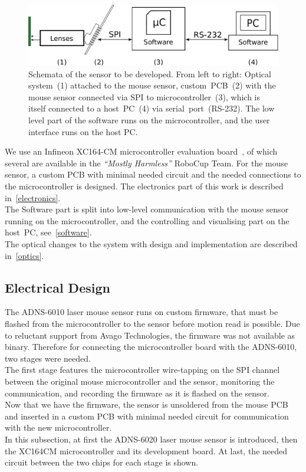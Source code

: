 \documentclass[12pt,a4paper]{article}
\newcommand{\MH}{\emph{``Mostly Harmless''} RoboCup Team\xspace}
\begin{document}
\begin{figure}[hb]
\begin{center}
\includegraphics[width=0.9\columnwidth]{figures/block_diagram}
\caption{\label{fig:block-diag-sens}
Schemata of the sensor to be developed.
From left to right:
Optical system~(1) attached to the mouse sensor,
custom~PCB~(2) with the mouse sensor connected via SPI to microcontroller~(3), which is itself connected to a host~PC~(4) via serial~port~(RS-232).
The low level part of the software runs on the microcontroller, and the user interface runs on the host PC.
}

\end{center}
\end{figure}

We use an Infineon XC164-CM microcontroller evaluation board~\cite{xc}, of which several are available in the \MH.
For the mouse sensor, a custom PCB with minimal needed circuit and the needed connections to the microcontroller is designed.
The electronics part of this work is described in~\autoref{electronics}.\\
The Software part is split into low-level communication with the mouse sensor running on the microcontroller, and the controlling and visualising part on the host~PC, see~\autoref{software}.\\
The optical changes to the system with design and implementation are described in~\autoref{optics}.


\subsection{Electrical Design}
\label{electronics}


The ADNS-6010 laser mouse sensor runs on custom firmware, that must be flashed from the microcontroller to the sensor before motion read is possible.
Due to reluctant support from Avago Technologies, the firmware was not available as binary.
Therefore for connecting the microcontroller board with the ADNS-6010, two stages were needed.\\
The first stage features the microcontroller wire-tapping on the SPI channel between the original mouse microcontroller and the sensor, monitoring the communication, and recording the firmware as it is flashed on the sensor.\\
Now that we have the firmware, the sensor is unsoldered from the mouse PCB and inserted in a custom PCB with minimal needed circuit for communication with the new microcontroller.\\
In this subsection, at first the ADNS-6020 laser mouse sensor is introduced, then the XC164CM microcontroller and its development board.
At last, the needed circuit between the two chips for each stage is shown.
\end{document}
